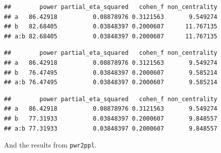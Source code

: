\documentclass[]{book}
\newenvironment{Shaded}{\begin{snugshade}}{\end{snugshade}}
\newcommand{\DataTypeTok}[1]{\textcolor[rgb]{0.13,0.29,0.53}{#1}}
\newcommand{\KeywordTok}[1]{\textcolor[rgb]{0.13,0.29,0.53}{\textbf{#1}}}
\newcommand{\NormalTok}[1]{#1}
\newcommand{\OperatorTok}[1]{\textcolor[rgb]{0.81,0.36,0.00}{\textbf{#1}}}
\newcommand{\OtherTok}[1]{\textcolor[rgb]{0.56,0.35,0.01}{#1}}
\newcommand{\StringTok}[1]{\textcolor[rgb]{0.31,0.60,0.02}{#1}}
\begin{document}
\begin{verbatim}
##        power partial_eta_squared   cohen_f non_centrality
## a   86.42918          0.08878976 0.3121563       9.549274
## b   82.68405          0.03848397 0.2000607      11.767135
## a:b 82.68405          0.03848397 0.2000607      11.767135
\end{verbatim}

\begin{Shaded}
\end{Shaded}

\begin{verbatim}
##        power partial_eta_squared   cohen_f non_centrality
## a   86.42918          0.08878976 0.3121563       9.549274
## b   76.47495          0.03848397 0.2000607       9.585214
## a:b 76.47495          0.03848397 0.2000607       9.585214
\end{verbatim}

\begin{Shaded}
\end{Shaded}

\begin{verbatim}
##        power partial_eta_squared   cohen_f non_centrality
## a   86.42918          0.08878976 0.3121563       9.549274
## b   77.31933          0.03848397 0.2000607       9.848557
## a:b 77.31933          0.03848397 0.2000607       9.848557
\end{verbatim}

And the results from \texttt{pwr2ppl}.
\end{document}
